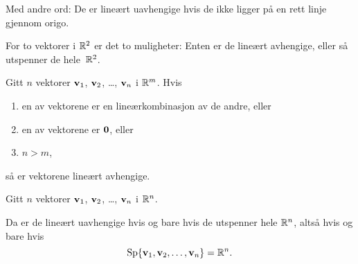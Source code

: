 Med andre ord: De er lineært uavhengige hvis de ikke ligger på en rett
linje gjennom origo.

For to vektorer i $\mathbb{R}^2$ er det to muligheter: Enten er de lineært
avhengige, eller så utspenner de hele~$\mathbb{R}^2$.



\begin{thm}
Gitt $n$ vektorer  $\mathbf{v}_1$, $\mathbf{v}_2$, \ldots, $\mathbf{v}_n$ i $\mathbb{R}^m$.  Hvis
\begin{enumerate}
\item en av vektorene er en lineærkombinasjon av de andre, eller
\item en av vektorene er $\mathbf{0}$, eller
\item $n > m$,
\end{enumerate}
så er vektorene lineært avhengige.
\end{thm}



\begin{thm}
Gitt $n$ vektorer $\mathbf{v}_1$, $\mathbf{v}_2$, \ldots, $\mathbf{v}_n$ i $\mathbb{R}^n$.

Da er de lineært uavhengige hvis og bare hvis de utspenner hele $\mathbb{R}^n$,
altså hvis og bare hvis
\[
\operatorname{Sp} \{ \mathbf{v}_1, \mathbf{v}_2, \ldots, \mathbf{v}_n \} = \mathbb{R}^n.
\]
\end{thm}




\kapittelslutt

